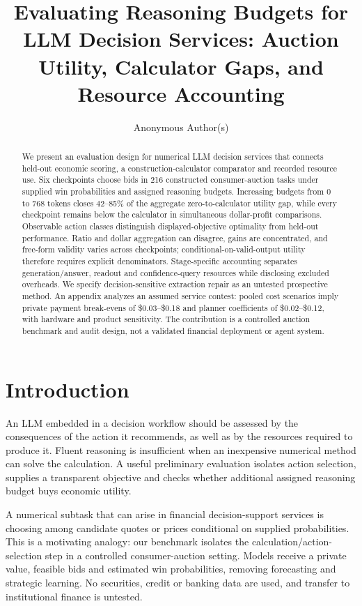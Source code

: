 \documentclass[sigconf,anonymous,nonacm]{acmart}
\title[Reasoning Budgets for LLM Decision Services]{Evaluating Reasoning Budgets for LLM Decision Services: Auction Utility, Calculator Gaps, and Resource Accounting}
\author{Anonymous Author(s)}
\begin{document}
\begin{abstract}
We present an evaluation design for numerical LLM decision services that connects held-out economic scoring, a construction-calculator comparator and recorded resource use. Six checkpoints choose bids in 216 constructed consumer-auction tasks under supplied win probabilities and assigned reasoning budgets. Increasing budgets from 0 to 768 tokens closes 42--85\% of the aggregate zero-to-calculator utility gap, while every checkpoint remains below the calculator in simultaneous dollar-profit comparisons. Observable action classes distinguish displayed-objective optimality from held-out performance. Ratio and dollar aggregation can disagree, gains are concentrated, and free-form validity varies across checkpoints; conditional-on-valid-output utility therefore requires explicit denominators. Stage-specific accounting separates generation/answer, readout and confidence-query resources while disclosing excluded overheads. We specify decision-sensitive extraction repair as an untested prospective method. An appendix analyzes an assumed service contest: pooled cost scenarios imply private payment break-evens of \$0.03--\$0.18 and planner coefficients of \$0.02--\$0.12, with hardware and product sensitivity. The contribution is a controlled auction benchmark and audit design, not a validated financial deployment or agent system.
\end{abstract}
\maketitle
\section{Introduction}
An LLM embedded in a decision workflow should be assessed by the consequences of the action it recommends, as well as by the resources required to produce it. Fluent reasoning is insufficient when an inexpensive numerical method can solve the calculation. A useful preliminary evaluation isolates action selection, supplies a transparent objective and checks whether additional assigned reasoning budget buys economic utility.

A numerical subtask that can arise in financial decision-support services is choosing among candidate quotes or prices conditional on supplied probabilities. This is a motivating analogy: our benchmark isolates the calculation/action-selection step in a controlled consumer-auction setting. Models receive a private value, feasible bids and estimated win probabilities, removing forecasting and strategic learning. No securities, credit or banking data are used, and transfer to institutional finance is untested.
\end{document}
